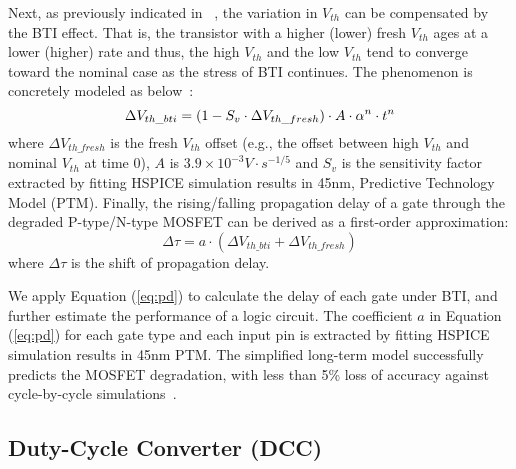 Next, as previously indicated in~\cite{wang2010impact, gomez2016early} , the variation in $V_{th}$ can be compensated by the BTI effect. That is, the transistor with a higher (lower) fresh $V_{th}$ ages at a lower (higher) rate and thus, the high $V_{th}$ and the low $V_{th}$ tend to converge toward the nominal case as the stress of BTI continues. The phenomenon is concretely modeled as below~\cite{gomez2016early}:
\begin{equation}
	\centering
	\Delta V_{th\_bti} = (1 - S_{v} \cdot \Delta V_{th\_fresh})  \cdot A \cdot \alpha^n \cdot t^n
	\label{eq:cor}
\end{equation}
where $\Delta V_{th\_fresh}$ is the fresh $V_{th}$ offset (e.g., the offset between high $V_{th}$ and nominal $V_{th}$ at time 0), $A$ is $3.9 \times 10^{-3} V \cdot s^{-1/5}$ and $S_{v}$ is the sensitivity factor extracted by fitting HSPICE simulation results in 45nm, Predictive Technology Model (PTM).
Finally, the rising/falling propagation delay of a gate through the degraded P-type/N-type MOSFET can be derived as a first-order approximation:
\begin{equation}
	\label{eq:pd}
	\Delta \tau = a \cdot (\Delta V_{th\_bti} + \Delta V_{th\_fresh})
\end{equation}
where $\Delta \tau$ is the shift of propagation delay.

We apply Equation (\ref{eq:pd}) to calculate the delay of each gate under BTI, and further estimate the performance of a logic circuit. The coefficient $a$ in Equation (\ref{eq:pd}) for each gate type and each input pin is extracted by fitting HSPICE simulation results in 45nm PTM. The simplified long-term model successfully predicts the MOSFET degradation, with less than 5\% loss of accuracy against cycle-by-cycle simulations~\cite{wang2007efficient, wang2010impact, gomez2016early, amrouch2016reliability}.

\subsection{Duty-Cycle Converter (DCC)}



